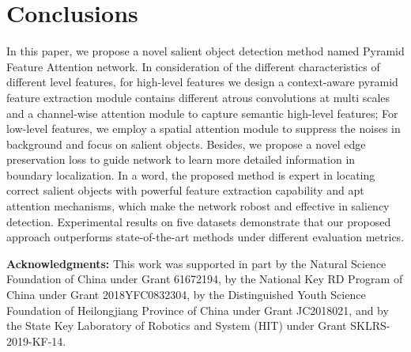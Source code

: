 \documentclass[10pt,twocolumn,letterpaper]{article}
\begin{document}
\section{Conclusions}
In this paper, we propose a novel salient object detection method named Pyramid Feature Attention network. In consideration of the different characteristics of different level features, for high-level features we design a context-aware pyramid feature extraction module contains different atrous convolutions at multi scales and a channel-wise attention module to capture semantic high-level features; For low-level features, we employ a spatial attention module to suppress the noises in background and focus on salient objects. Besides, we propose a novel edge preservation loss to guide network to learn more detailed information in boundary localization.  In a word, the proposed method is expert in locating correct salient objects with powerful feature extraction capability and apt attention mechanisms, which make the network robost and effective in saliency detection. Experimental results on five datasets demonstrate that our proposed approach outperforms state-of-the-art methods under different evaluation metrics.


\textbf{Acknowledgments:} This work was supported in part by the Natural Science Foundation of China under Grant 61672194, by the National Key RD Program of China under Grant 2018YFC0832304, by the Distinguished Youth Science Foundation of Heilongjiang Province of China under Grant JC2018021, and by the State Key Laboratory of Robotics and System (HIT) under Grant SKLRS-2019-KF-14.


{\small


}
\end{document}
